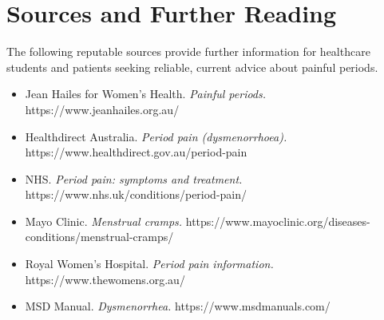 \section*{Sources and Further Reading}
The following reputable sources provide further information for healthcare students and patients seeking reliable, current advice about painful periods.
\begin{itemize}
    \item Jean Hailes for Women's Health. \textit{Painful periods.} https://www.jeanhailes.org.au/
    \item Healthdirect Australia. \textit{Period pain (dysmenorrhoea).} https://www.healthdirect.gov.au/period-pain
    \item NHS. \textit{Period pain: symptoms and treatment.} https://www.nhs.uk/conditions/period-pain/
    \item Mayo Clinic. \textit{Menstrual cramps.} https://www.mayoclinic.org/diseases-conditions/menstrual-cramps/
    \item Royal Women's Hospital. \textit{Period pain information.} https://www.thewomens.org.au/
    \item MSD Manual. \textit{Dysmenorrhea.} https://www.msdmanuals.com/
\end{itemize}
